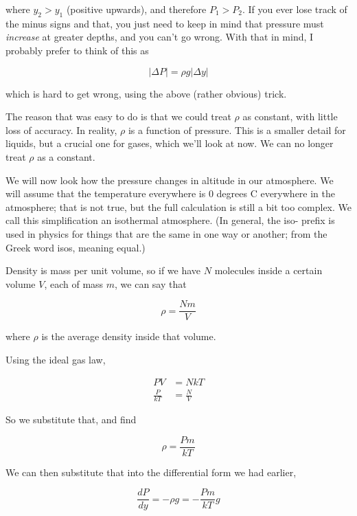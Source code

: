 \documentclass[8.01x]{subfiles}
\begin{document}
where $y_2 > y_1$ (positive upwards), and therefore $P_1 > P_2$. If you ever lose track of the minus signs and that, you just need to keep in mind that pressure must \emph{increase} at greater depths, and you can't go wrong. With that in mind, I probably prefer to think of this as

\begin{equation}
|\Delta P| = \rho g |\Delta y|
\end{equation}

which is hard to get wrong, using the above (rather obvious) trick.

The reason that was easy to do is that we could treat $\rho$ as constant, with little loss of accuracy. In reality, $\rho$ is a function of pressure. This is a smaller detail for liquids, but a crucial one for gases, which we'll look at now. We can no longer treat $\rho$ as a constant.

We will now look how the pressure changes in altitude in our atmosphere. We will assume that the temperature everywhere is 0 degrees C everywhere in the atmosphere; that is not true, but the full calculation is still a bit too complex. We call this simplification an isothermal atmosphere. (In general, the iso- prefix is used in physics for things that are the same in one way or another; from the Greek word isos, meaning equal.)

Density is mass per unit volume, so if we have $N$ molecules inside a certain volume $V$, each of mass $m$, we can say that

\begin{equation}
\rho = \frac{N m}{V}
\end{equation}

where $\rho$ is the average density inside that volume.

Using the ideal gas law,

\begin{align}
PV &= N k T\\
\frac{P}{k T} &= \frac{N}{V}
\end{align}

So we substitute that, and find

\begin{equation}
\rho = \frac{P m}{k T}
\end{equation}

We can then substitute that into the differential form we had earlier,

\begin{equation}
\frac{dP}{dy} = - \rho g = - \frac{P m }{k T} g
\end{equation}
\end{document}
